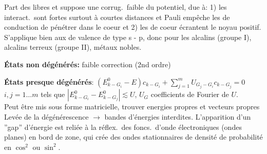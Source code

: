 Part des \elec libres et suppose une corrug.\ faible du potentiel, due à: 
1) les interact.\ sont fortes surtout à courtes distances et Pauli empêche les \elec de conduction de pénétrer dans le coeur et 
2) les \elec de coeur écrantent le noyau positif. S'applique bien aux \elec de valence de type s - p, donc pour les alcalins (groupe I), alcalins terreux (groupe II), métaux nobles.
\begin{squishlist}
    \item \textbf{États non dégénérés:} faible correction (2nd ordre)
    \item \textbf{États presque dégénérés}: $(E_{k-G_i}^0 - E) c_{k-G_i} + \sum_{j=1}^m U_{G_j - G_i} c_{k-G_j} = 0$ \\
    $i,j = 1 \ldots m$ tels que $|E_{k-G_i}^0 - E_{k-G_j}^0| \lesssim U$, \quad $U_G$ coefficients de Fourier de $U$. \\
    Peut être mis sous forme matricielle, trouver energies propres et vecteurs propres \\
    Levée de la dégénérescence $\rightarrow$ bandes d'énergies interdites.
    L’apparition d’un ”gap” d’énergie est reliée à la réflex.\ des foncs.\ d’onde électroniques (ondes planes) en bord de zone, qui crée des ondes
    stationnaires de densité de probabilité en $\cos^2$ ou $\sin^2$.
\end{squishlist}

